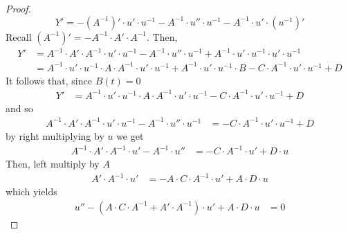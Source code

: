 \begin{proof}
\begin{equation*}
    Y' = -(A^{-1})' \cdot u' \cdot u^{-1} - A^{-1} \cdot u'' \cdot u^{-1} - A^{-1} \cdot u' \cdot (u^{-1})'
\end{equation*}
Recall $(A^{-1})' = - A^{-1} \cdot A' \cdot A^{-1}$. Then, 
\begin{equation*}
    \begin{split}
        Y' &= A^{-1} \cdot A' \cdot A^{-1} \cdot u' \cdot u^{-1} - A^{-1} \cdot u'' \cdot u^{-1} + A^{-1} \cdot u' \cdot u^{-1} \cdot u' \cdot u^{-1}\\
        &= A^{-1} \cdot u' \cdot u^{-1} \cdot A \cdot A^{-1} \cdot u' \cdot u^{-1} + A^{-1} \cdot u' \cdot u^{-1} \cdot B - C \cdot A^{-1} \cdot u' \cdot u^{-1} + D  
    \end{split}
\end{equation*}
It follows that, since $B(t) = 0$
\begin{equation*}
    \begin{split}
        Y' &= A^{-1} \cdot u' \cdot u^{-1} \cdot A \cdot A^{-1} \cdot u' \cdot u^{-1} - C \cdot A^{-1} \cdot u' \cdot u^{-1} + D
    \end{split}
\end{equation*}
and so
\begin{equation*}
    \begin{split}
        A^{-1} \cdot A' \cdot A^{-1} \cdot u' \cdot u^{-1} - A^{-1} \cdot u'' \cdot u^{-1} &= - C \cdot A^{-1} \cdot u' \cdot u^{-1} + D
    \end{split}
\end{equation*}
by right multiplying by $u$ we get
\begin{equation*}
    \begin{split}
        A^{-1} \cdot A' \cdot A^{-1} \cdot u' - A^{-1} \cdot u'' &= - C \cdot A^{-1} \cdot u' + D \cdot u
    \end{split}
\end{equation*}
Then, left multiply by $A$
\begin{equation*}
    \begin{split}
        A' \cdot A^{-1} \cdot u' &= - A \cdot C \cdot A^{-1} \cdot u' + A \cdot D \cdot u
    \end{split}
\end{equation*}
which yields
\begin{equation}
\tag{E1}
    \begin{split}
        u'' - (A \cdot C \cdot A^{-1} + A' \cdot A^{-1}) \cdot u' + A \cdot D \cdot u &= 0
    \end{split}
\end{equation}
\end{proof}

